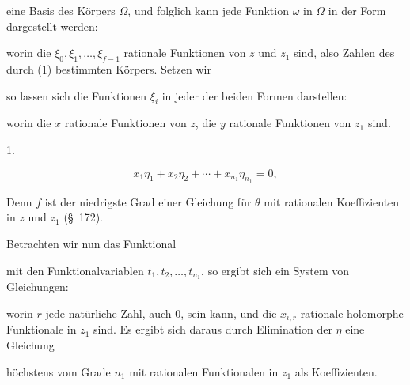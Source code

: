 eine Basis des K\"orpers $\Omega$, und folglich kann jede Funktion $\omega$
in $\Omega$ in der Form dargestellt werden:

worin die $\xi_0, \xi_1, \ldots, \xi_{f-1}$ rationale Funktionen von $z$ und
$z_1$ sind, also Zahlen des durch (1) bestimmten K\"orpers. Setzen wir

so lassen sich die Funktionen $\xi_i$ in jeder der beiden Formen
darstellen:

worin die $x$ rationale Funktionen von $z$, die $y$ rationale Funktionen
von $z_1$ sind.

1. 


\[
x_1\eta_1 + x_2\eta_2 + \cdots + x_{n_1}\eta_{n_1} = 0,
\]

Denn $f$ ist der niedrigste Grad einer Gleichung f\"ur $\theta$ mit
rationalen Koeffizienten in $z$ und $z_1$ (\S\ 172).

Betrachten wir nun das Funktional

mit den Funktionalvariablen $t_1, t_2, \ldots, t_{n_1}$, so ergibt sich
ein System von Gleichungen:

worin $r$ jede nat\"urliche Zahl, auch 0, sein kann, und die $x_{i,r}$
rationale holomorphe Funktionale in $z_1$ sind. Es ergibt sich daraus
durch Elimination der $\eta$ eine Gleichung

h\"ochstens vom Grade $n_1$ mit rationalen Funktionalen in $z_1$ als
Koeffizienten.
